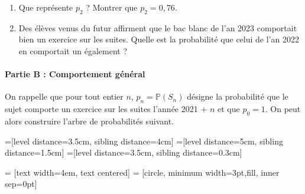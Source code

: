 \documentclass[11pt,fleqn, openany]{book} %
\begin{document}
\begin{exercise}[topic=prob01]
\begin{enumerate}
\begin{center}
\end{center}

    
    \item Que représente $p_2$ ? Montrer que $p_2=0,76$.
    \item Des élèves venus du futur affirment que le bac blanc de l'an 2023 comportait bien un exercice sur les suites. Quelle est la probabilité que celui de l'an 2022 en comportait un également ?
\end{enumerate}

\newpage

\paragraph{Partie B : Comportement général}

On rappelle que pour tout entier $n$, $p_n=\mathbb{P}(S_n)$ désigne la probabilité que le sujet comporte un exercice sur les suites l'année 2021 + $n$ et que $p_0=1$. On peut alors construire l'arbre de probabilités suivant.


    
    =[level distance=3.5cm, sibling distance=4cm]
=[level distance=5cm, sibling distance=1.5cm]
=[level distance=3.5cm, sibling distance=0.3cm]

 = [text width=4em, text centered]
 = [circle, minimum width=3pt,fill, inner sep=0pt]



\end{exercise}
\end{document}
